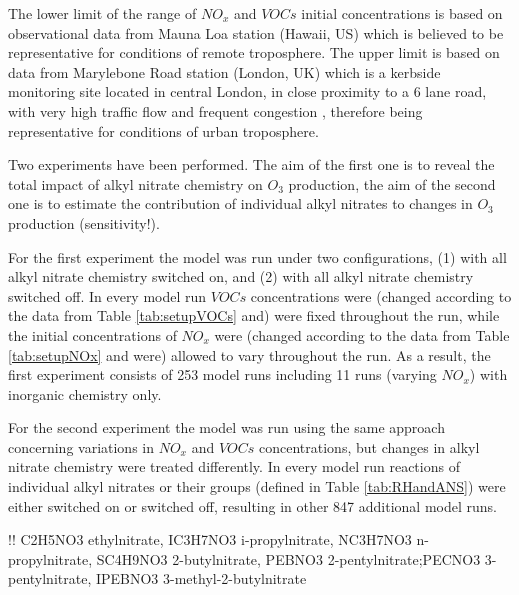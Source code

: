 \documentclass[11pt,a4paper]{article}
\begin{document}
The lower limit of the range of $NO_x$ and $VOCs$ initial concentrations is based on observational data from Mauna Loa station (Hawaii, US) which is believed to be representative for conditions of remote troposphere. The upper limit is based on data from 
Marylebone Road station (London, UK) which is a kerbside monitoring site located in central London, in close proximity to a 6 lane road, with very high traffic flow and frequent congestion \citep{VonSchneidemesser2010}, therefore being representative for conditions of urban troposphere.

Two experiments have been performed. The aim of the first one is to reveal the total impact of alkyl nitrate chemistry on $O_3$ production, the aim of the second one is to estimate the contribution of individual alkyl nitrates to changes in $O_3$ production (sensitivity!).

For the first experiment the model was run under two configurations, (1) with all alkyl nitrate chemistry switched on, and (2) with all alkyl nitrate chemistry switched off. In every model run $VOCs$ concentrations were (changed according to the data from Table \ref{tab:setupVOCs} and) were fixed throughout the run, while the initial concentrations of $NO_x$ were (changed according to the data from Table \ref{tab:setupNOx} and were) allowed to vary throughout the run. As a result, the first experiment consists of 253 model runs including 11 runs (varying $NO_x$) with inorganic chemistry only.

For the second experiment the model was run using the same approach concerning variations in $NO_x$ and $VOCs$ concentrations, but changes in alkyl nitrate chemistry were treated differently. In every model run reactions of individual alkyl nitrates or their groups (defined in Table \ref{tab:RHandANS}) were either switched on or switched off, resulting in other 847 additional model runs.

!! C2H5NO3 ethylnitrate, IC3H7NO3 i-propylnitrate, NC3H7NO3  n-propylnitrate, SC4H9NO3 2-butylnitrate, PEBNO3 2-pentylnitrate;PECNO3 3-pentylnitrate, IPEBNO3 3-methyl-2-butylnitrate
\end{document}
